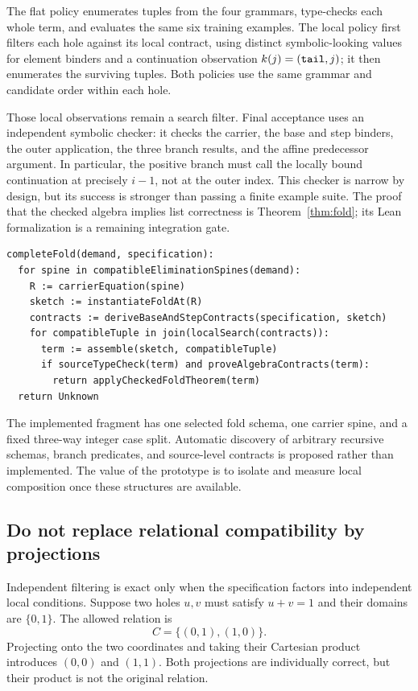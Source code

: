 The flat policy enumerates tuples from the four grammars, type-checks each whole
term, and evaluates the same six training examples. The local policy first
filters each hole against its local contract, using distinct symbolic-looking
values for element binders and a continuation observation $k(j)=({\tt tail},j)$;
it then enumerates the surviving tuples. Both policies use the same grammar
and candidate order within each hole.

Those local observations remain a search filter. Final acceptance uses an
independent symbolic checker: it checks the carrier, the base and step binders,
the outer application, the three branch results, and the affine predecessor
argument. In particular, the positive branch must call the locally bound
continuation at precisely $i-1$, not at the outer index. This checker is narrow
by design, but its success is stronger than passing a finite example suite.
The proof that the checked algebra implies list correctness is
Theorem~\ref{thm:fold}; its Lean formalization is a remaining integration gate.

\begin{lstlisting}
completeFold(demand, specification):
  for spine in compatibleEliminationSpines(demand):
    R := carrierEquation(spine)
    sketch := instantiateFoldAt(R)
    contracts := deriveBaseAndStepContracts(specification, sketch)
    for compatibleTuple in join(localSearch(contracts)):
      term := assemble(sketch, compatibleTuple)
      if sourceTypeCheck(term) and proveAlgebraContracts(term):
        return applyCheckedFoldTheorem(term)
  return Unknown
\end{lstlisting}

The implemented fragment has one selected fold schema, one carrier spine, and a
fixed three-way integer case split. Automatic discovery of arbitrary recursive
schemas, branch predicates, and source-level contracts is proposed rather than
implemented. The value of the prototype is to isolate and measure local
composition once these structures are available.

\subsection{Do not replace relational compatibility by projections}

Independent filtering is exact only when the specification factors into
independent local conditions. Suppose two holes $u,v$ must satisfy $u+v=1$ and
their domains are $\{0,1\}$. The allowed relation is
\[
 C=\{(0,1),(1,0)\}.
\]
Projecting onto the two coordinates and taking their Cartesian product introduces
$(0,0)$ and $(1,1)$. Both projections are individually correct, but their product
is not the original relation.

